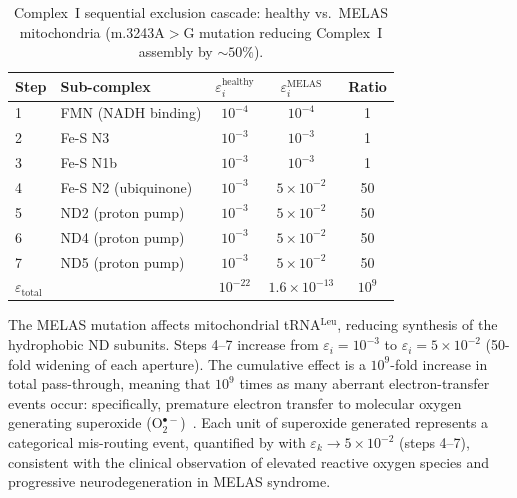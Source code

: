 \begin{table}[htbp]
\centering
\caption{Complex~I sequential exclusion cascade: healthy vs.\ MELAS
         mitochondria (m.3243A$>$G mutation reducing Complex~I assembly
         by $\sim 50\%$).}
\label{tab:ch03-complex1}
\begin{tabular}{llccc}
\hline
Step & Sub-complex & $\varepsilon_i^{\mathrm{healthy}}$ &
      $\varepsilon_i^{\mathrm{MELAS}}$ & Ratio \\
\hline
1 & FMN (NADH binding)   & $10^{-4}$ & $10^{-4}$ & 1 \\
2 & Fe-S N3              & $10^{-3}$ & $10^{-3}$ & 1 \\
3 & Fe-S N1b             & $10^{-3}$ & $10^{-3}$ & 1 \\
4 & Fe-S N2 (ubiquinone) & $10^{-3}$ & $5\times10^{-2}$ & 50 \\
5 & ND2 (proton pump)    & $10^{-3}$ & $5\times10^{-2}$ & 50 \\
6 & ND4 (proton pump)    & $10^{-3}$ & $5\times10^{-2}$ & 50 \\
7 & ND5 (proton pump)    & $10^{-3}$ & $5\times10^{-2}$ & 50 \\
\hline
$\varepsilon_{\mathrm{total}}$ && $10^{-22}$ & $1.6\times10^{-13}$ & $10^{9}$ \\
\hline
\end{tabular}
\end{table}

The MELAS mutation affects mitochondrial tRNA$^{\mathrm{Leu}}$, reducing
synthesis of the hydrophobic ND subunits.  Steps 4--7 increase from
$\varepsilon_i=10^{-3}$ to $\varepsilon_i=5\times10^{-2}$ (50-fold widening
of each aperture).  The cumulative effect is a $10^9$-fold increase in
total pass-through, meaning that $10^9$ times as many aberrant
electron-transfer events occur: specifically, premature electron transfer
to molecular oxygen generating superoxide
(O$_2^{\bullet-}$)~\citep{Mitchell1961}.  Each unit of superoxide generated
represents a categorical mis-routing event, quantified by
 with $\varepsilon_k\to 5\times10^{-2}$
(steps 4--7), consistent with the clinical observation of elevated reactive
oxygen species and progressive neurodegeneration in MELAS
syndrome.
